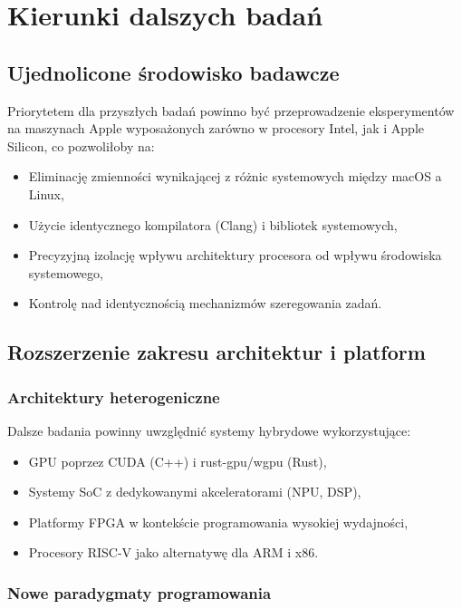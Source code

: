 \section{Kierunki dalszych badań}

\subsection{Ujednolicone środowisko badawcze}

Priorytetem dla przyszłych badań powinno być przeprowadzenie eksperymentów na maszynach Apple wyposażonych zarówno w procesory Intel, jak i Apple Silicon, co pozwoliłoby na:
\begin{itemize}
    \item Eliminację zmienności wynikającej z różnic systemowych między macOS a Linux,
    \item Użycie identycznego kompilatora (Clang) i bibliotek systemowych,
    \item Precyzyjną izolację wpływu architektury procesora od wpływu środowiska systemowego,
    \item Kontrolę nad identycznością mechanizmów szeregowania zadań.
\end{itemize}

\subsection{Rozszerzenie zakresu architektur i platform}

\subsubsection{Architektury heterogeniczne}

Dalsze badania powinny uwzględnić systemy hybrydowe wykorzystujące:
\begin{itemize}
    \item GPU poprzez CUDA (C++) i rust-gpu/wgpu (Rust),
    \item Systemy SoC z dedykowanymi akceleratorami (NPU, DSP),
    \item Platformy FPGA w kontekście programowania wysokiej wydajności,
    \item Procesory RISC-V jako alternatywę dla ARM i x86.
\end{itemize}

\subsubsection{Nowe paradygmaty programowania}

